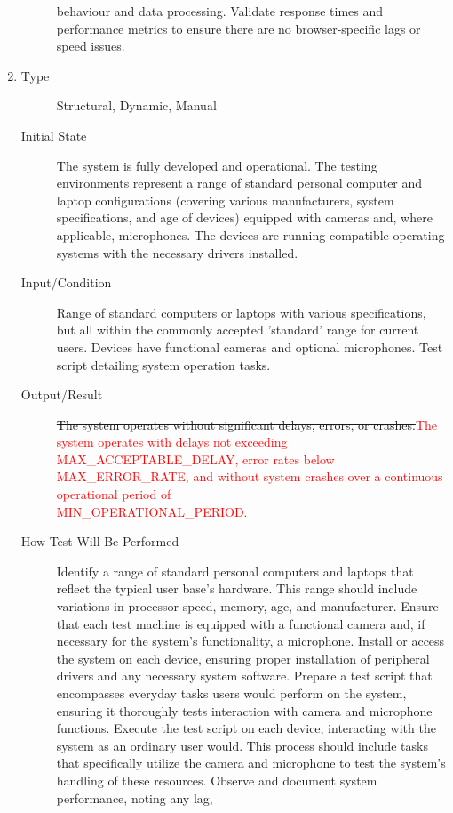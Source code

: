 \documentclass[12pt, titlepage]{article}
\newcommand{\rt}[1]{\textcolor{red}{#1}}
\begin{document}
\begin{enumerate}[NFR-T1]
\begin{description}
    behaviour and data processing. Validate response times and performance
    metrics to ensure there are no browser-specific lags or speed issues.
  \end{description}
\item \label{NFRT18}
  \begin{description}
  \item[Type] Structural, Dynamic, Manual
  \item[Initial State] The system is fully developed and operational. The
    testing environments represent a range of standard personal computer and
    laptop configurations (covering various manufacturers, system
    specifications, and age of devices) equipped with cameras and, where
    applicable, microphones. The devices are running compatible operating
    systems with the necessary drivers installed.
  \item[Input/Condition] Range of standard computers or laptops with various
    specifications, but all within the commonly accepted 'standard' range for
    current users. Devices have functional cameras and optional microphones.
    Test script detailing system operation tasks.
  \item[Output/Result] \sout{The system operates without significant delays, errors,
  or crashes.}\rt{The system operates with delays not exceeding\\ MAX\_ACCEPTABLE\_DELAY, 
  error rates below MAX\_ERROR\_RATE, and without system crashes over a continuous 
  operational period of\\ MIN\_OPERATIONAL\_PERIOD.}
  \item[How Test Will Be Performed] Identify a range of standard personal
    computers and laptops that reflect the typical user base's hardware. This
    range should include variations in processor speed, memory, age, and
    manufacturer. Ensure that each test machine is equipped with a functional
    camera and, if necessary for the system's functionality, a microphone.
    Install or access the system on each device, ensuring proper installation of
    peripheral drivers and any necessary system software. Prepare a test script
    that encompasses everyday tasks users would perform on the system, ensuring
    it thoroughly tests interaction with camera and microphone functions.
    Execute the test script on each device, interacting with the system as an
    ordinary user would. This process should include tasks that specifically
    utilize the camera and microphone to test the system’s handling of these
    resources. Observe and document system performance, noting any lag,

\end{description}
\end{enumerate}
\end{document}
